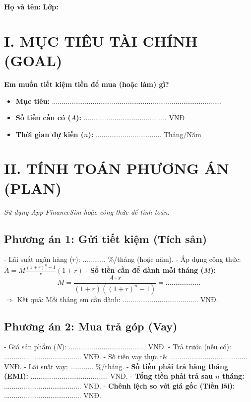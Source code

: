 \documentclass[12pt,a4paper]{article}
\begin{document}
\begin{center}
    \vspace{0.5cm}
\end{center}

\noindent \textbf{Họ và tên:} \dotfill \textbf{Lớp:} \dotfill

\section*{\color{fingreen} I. MỤC TIÊU TÀI CHÍNH (GOAL)}
\textbf{Em muốn tiết kiệm tiền để mua (hoặc làm) gì?}
\begin{itemize}
    \item \textbf{Mục tiêu:} ........................................................................................
    \item \textbf{Số tiền cần có ($A$):} ........................................... VNĐ
    \item \textbf{Thời gian dự kiến ($n$):} .................................. Tháng/Năm
\end{itemize}

\section*{\color{fingreen} II. TÍNH TOÁN PHƯƠNG ÁN (PLAN)}
\textit{Sử dụng App FinanceSim hoặc công thức để tính toán.}

\subsection*{Phương án 1: Gửi tiết kiệm (Tích sản)}
- Lãi suất ngân hàng ($r$): ............ \%/tháng (hoặc năm).
- Áp dụng công thức: $A = M \frac{(1+r)^n - 1}{r}(1+r)$
- \textbf{Số tiền cần để dành mỗi tháng ($M$):}
$$ M = \frac{A \cdot r}{(1+r)((1+r)^n - 1)} = \dots\dots\dots\dots\dots\dots $$
$\Rightarrow$ Kết quả: Mỗi tháng em cần dành: ....................................... VNĐ.

\subsection*{Phương án 2: Mua trả góp (Vay)}
- Giá sản phẩm ($N$): ........................................ VNĐ.
- Trả trước (nếu có): ........................................ VNĐ.
- Số tiền vay thực tế: ........................................ VNĐ.
- Lãi suất vay: ............ \%/tháng.
- \textbf{Số tiền phải trả hàng tháng (EMI):} ........................................ VNĐ.
- \textbf{Tổng tiền phải trả sau $n$ tháng:} ........................................ VNĐ.
- \textbf{Chênh lệch so với giá gốc (Tiền lãi):} ........................................ VNĐ.
\end{document}
